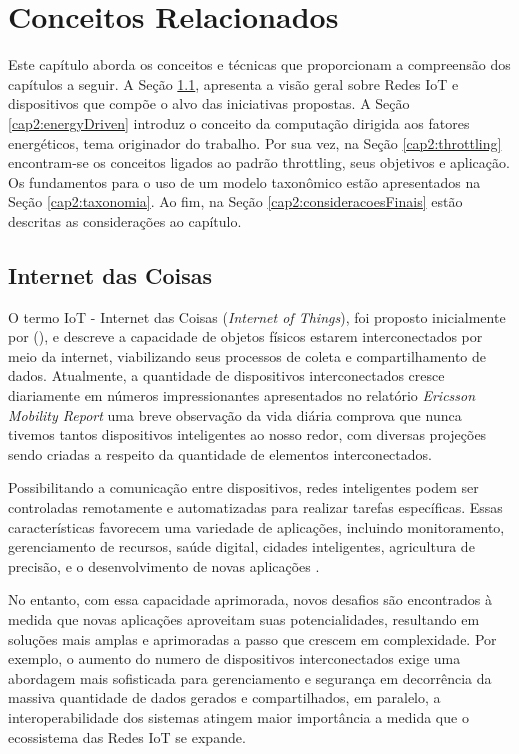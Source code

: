 \chapter{Conceitos Relacionados}
\label{cap:cap2}

Este capítulo aborda os conceitos e técnicas que proporcionam a compreensão dos capítulos a seguir. A Seção \ref{cap2:iot}, apresenta a visão geral sobre Redes IoT e dispositivos que compõe o alvo das iniciativas propostas. A Seção \ref{cap2:energyDriven} introduz o conceito da computação dirigida aos fatores energéticos, tema originador do trabalho.  Por sua vez, na Seção \ref{cap2:throttling} encontram-se os conceitos ligados ao padrão throttling, seus objetivos e aplicação. Os fundamentos para o uso de um modelo taxonômico estão apresentados na Seção \ref{cap2:taxonomia}. Ao fim, na Seção \ref{cap2:consideracoesFinais} estão descritas as considerações ao capítulo.


\section{Internet das Coisas}
\label{cap2:iot}

O termo IoT - Internet das Coisas (\textit{Internet of Things}), foi proposto inicialmente por \citeauthor{ashton1999internet} (\citeyear{ashton1999internet}), e descreve a capacidade de objetos físicos estarem interconectados por meio da internet, viabilizando seus processos de coleta e compartilhamento de dados. Atualmente, a quantidade de dispositivos interconectados cresce diariamente em números impressionantes apresentados no relatório \textit{Ericsson Mobility Report} \cite{noauthor_ericsson_2024} uma breve observação da vida diária comprova que nunca tivemos tantos dispositivos inteligentes ao nosso redor, com diversas projeções sendo criadas a respeito da quantidade de elementos interconectados.

Possibilitando a comunicação entre dispositivos,  redes inteligentes podem ser controladas remotamente e automatizadas para realizar tarefas específicas. Essas características favorecem uma variedade de aplicações, incluindo monitoramento, gerenciamento de recursos, saúde digital, cidades inteligentes, agricultura de precisão, e o desenvolvimento de novas aplicações \cite{miorandi2012internet, asghari_internet_2019}.

No entanto, com essa capacidade aprimorada, novos desafios são encontrados à medida que novas aplicações aproveitam suas potencialidades, resultando em soluções mais amplas e aprimoradas a passo que crescem em complexidade. Por exemplo, o aumento do numero de dispositivos interconectados exige uma abordagem mais sofisticada para gerenciamento e segurança em decorrência da massiva quantidade de dados gerados e compartilhados, em paralelo, a interoperabilidade dos sistemas atingem maior importância a medida que o ecossistema das Redes IoT se expande. 

